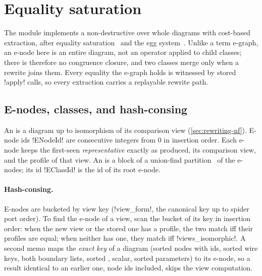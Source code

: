 \section{Equality saturation}\label{sec:rewriting-egraph}

The module  implements a non-destructive  over
whole diagrams with cost-based extraction, after equality saturation~\cite{tate2011eqsat} and the
egg system~\cite{willsey2021egg}. Unlike a term e-graph, an e-node here is an entire diagram, not
an operator applied to child classes; there is therefore no congruence closure, and two classes
merge only when a rewrite joins them. Every equality the e-graph holds is witnessed by stored
\py!apply! calls, so every extraction carries a replayable rewrite path.

\subsection{E-nodes, classes, and hash-consing}

\begin{definition}\label{def:rewriting-enode}
An  is a diagram up to isomorphism of its comparison view (\cref{sec:rewriting-nf}).
E-node ids \py!ENodeId! are consecutive integers from $0$ in insertion order. Each e-node keeps the
first-seen \emph{representative} exactly as produced, its comparison view, and the profile of that
view. An  is a block of a union-find partition~\cite{tarjan1975unionfind} of the
e-nodes; its id \py!EClassId! is the id of its root e-node.
\end{definition}

\paragraph{Hash-consing.}
E-nodes are bucketed by view key (\py!view_form!, the canonical key up to spider port order). To find
the e-node of a view, scan the bucket of its key in insertion order: when the new view or the
stored one has a profile, the two match iff their profiles are equal; when neither has one, they
match iff \py!views_isomorphic!. A second memo maps the \emph{exact key} of a diagram (sorted nodes
with ids, sorted wire keys, both boundary lists, sorted \bboxes{}, scalar, sorted parameters) to its
e-node, so a result identical to an earlier one, node ids included, skips the view computation.

